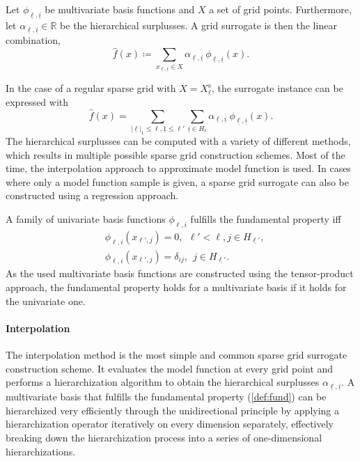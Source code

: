 \documentclass[
  a4paper,  %
  twoside,  %
  bibliography=totoc,
  headsepline,
  cleardoublepage=empty,
  parskip=half,
  draft=false
]{scrbook}
\begin{document}
\begin{definition}
Let $\phi_{\underline{\ell},\underline{i}}$ be multivariate basis functions and $X$ a set of grid points.
Furthermore, let $\alpha_{\underline{\ell},\underline{i}} \in \mathds{R}$ be the hierarchical surplusses.
A grid surrogate is then the linear combination,
\begin{equation}
\hat{f}(x) \coloneqq \sum_{x_{\underline{\ell},\underline{i}} \in X} \alpha_{\underline{\ell},\underline{i}} ~ \phi_{
\underline{\ell},\underline{i}}(x).
\end{equation}
\end{definition}
%
In the case of a regular sparse grid with $X=X^{\mathrm{s}}_{\ell}$, the surrogate instance can be expressed with
\begin{equation}
\hat{f}(x) = \sum_{|\underline{\ell}|_1 \leq \ell, \underline{1} \leq \ell'} \sum_{\underline{i} \in {H_{\underline{\ell}}}} \alpha_{\underline{\ell},\underline{i}} ~ \phi_{
\underline{\ell},\underline{i}}(x).
\end{equation}
%
The hierarchical surplusses can be computed with a variety of different methods, which results in multiple possible sparse grid construction schemes.
Most of the time, the interpolation approach to approximate model function is used.
In cases where only a model function sample is given, a sparse grid surrogate can also be constructed using a regression approach.

\begin{definition}
A family of univariate basis functions $\phi_{\ell,i}$ fulfills the fundamental property iff
\begin{equation}
\begin{split}
&\phi_{\ell,i}(x_{\ell', j}) = 0, ~~  \ell' < \ell, j \in H_{\underline{\ell'}},\\
&\phi_{\ell,i}(x_{\ell', j}) = \delta_{ij}, ~~  j \in H_{\underline{\ell'}}.
\end{split}
\end{equation}
As the used multivariate basis functions are constructed using the tensor-product approach, the fundamental property holds for a multivariate basis if it holds for the univariate one.
\label{def:fund}
\end{definition}

\paragraph{Interpolation}
The interpolation method is the most simple and common sparse grid surrogate construction scheme.
It evaluates the model function at every grid point and performs a hierarchization algorithm to obtain the hierarchical surplusses $\alpha_{\underline{\ell},\underline{i}}$.
A multivariate basis that fulfills the fundamental property (\cref{def:fund}) can be hierarchized very efficiently through the unidirectional principle \cite{Balder1994} by applying a hierarchization operator iteratively on every dimension separately, effectively breaking down the hierarchization process into a series of one-dimensional hierarchizations.
\end{document}

